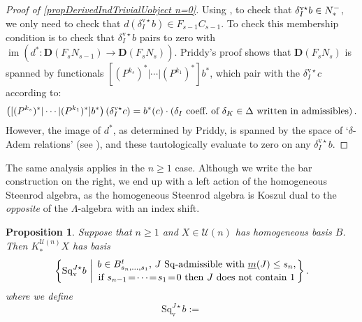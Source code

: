 \documentclass[11pt]{amsart} \renewcommand{\baselinestretch}{1.2}
\theoremstyle{plain}
\newtheorem{prop}[thm]{Proposition}
\theoremstyle{definition}
\DeclareMathOperator{\im}{im}
\renewcommand{\to}{\longrightarrow}
\newcommand{\calU}{\mathcal{U}}
\newcommand{\deltaalg}{\Delta} %
\newcommand{\minDimSq}{\underline{m}}
\newcommand{\produces}[3]{#3:#1\sim #2}
\renewcommand{\produces}[3]{#1\rightarrow_{#3} #2}%
\renewcommand{\produces}[3]{#1\overset{\smash{#3}}{\rightarrow} #2}%
\newcommand{\Nop}{N^{\smash{-}}}
\newcommand{\Sq}{\mathrm{Sq}}
\newcommand{\dver}{_\mathrm{v}}
\newcommand{\Sqvstar}[1]{\mathrm{Sq}\dver^{#1\star}}
\newcommand{\deltavstar}{\delta^{\mathrm{v}\star}}
\newcommand{\dual}{\mathbf{D}}
\begin{document}
\begin{Koszul complexes}
\begin{proof}[Proof of \ref{propDerivedIndTrivialUobject n=0}]
Using \cite[Lemma 3.2]{PriddyKoszul.pdf}, to check that $\deltavstar_Ib\in\Nop_*$, we only need to check that $d(\deltavstar_Ib)\in F_{s-1}C_{s-1}$.
To check this membership condition is to check that $\deltavstar_Ib$ pairs to zero with $\im(d^*:\dual(F_sN_{s-1})\to\dual(F_sN_s))$. Priddy's proof shows that $\dual(F_sN_s)$ is spanned by functionals $[(P^{k_s})^*|\cdots |(P^{k_1})^*]b^*$, which pair with the $\deltavstar_Ic$ according to: %
\[\left([(P^{k_s})^*|\cdots |(P^{k_1})^*]b^*\right)\left(\deltavstar_Ic\right)= b^*(c)\cdot\left(\textup{$\delta_I$ coeff.\ of $\delta_K\in\deltaalg$ written in admissibles}\right).\]
However, the image of $d^*$, as determined by Priddy, is spanned by the space of `$\delta$-Adem relations' (see \cite[Theorem 2.5 and proof]{PriddyKoszul.pdf}), and these tautologically evaluate to zero on any $\deltavstar_Ib$.
\end{proof}
The same analysis applies in the $n\geq1$ case. Although we write the bar construction on the right, we end up with a left action of the homogeneous Steenrod algebra, as the homogeneous Steenrod algebra is Koszul dual to the \emph{opposite} of the $\Lambda$-algebra with an index shift.
\begin{prop}
\label{propDerivedIndTrivialUobject n at least 1}
Suppose that $n\geq1$ and $X\in\calU(n)$ has homogeneous basis $B$. Then $K_*^{\calU(n)}X$ has basis
\[\left\{\Sqvstar{J}b\ \middle|\ \genfrac{}{}{0pt}{}{b\in B_{s_{n},\ldots,s_1}^t\textup{, $J$ $\Sq$-admissible with }\minDimSq(J)\leq s_n,}{\textup{if }s_{n-1}\!=\!\cdots\!=\!s_1\!=\!0\textup{ then $J$ does not contain 1}}\right\}.\]
where we define
\[\Sqvstar{J}b:=
\]
\end{prop}
\end{Koszul complexes}
\end{document}
